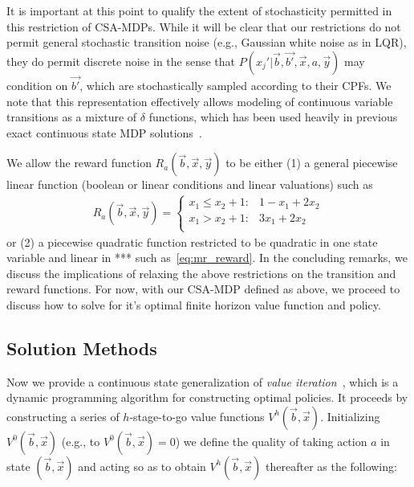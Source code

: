 It is important at this point to qualify the extent of stochasticity
permitted in this restriction of CSA-MDPs.  While it will be clear
that our restrictions do not permit general stochastic transition noise
(e.g., Gaussian white noise as in LQR), they do permit discrete noise
in the sense that $P(x_j'|\vec{b},\vec{b'},\vec{x},a,\vec{y})$
may condition on $\vec{b'}$, which are stochastically sampled according
to their CPFs.  
We note that this representation effectively allows modeling of
continuous variable transitions as a mixture of $\delta$ functions,
which has been used heavily in previous exact continuous state MDP 
solutions~\cite{feng04,hao09}.


We allow the reward function $R_a(\vec{b},\vec{x},\vec{y})$ to be either
(1) a general piecewise linear function (boolean or linear conditions
and linear valuations) such as
\begin{align}
R_a(\vec{b},\vec{x},\vec{y}) = \begin{cases}
x_1 \leq x_2 + 1 : & 1 - x_1 + 2x_2 \\
x_1 > x_2 + 1:     & 3x_1 + 2x_2 \\
\end{cases} \label{eq:linear_reward}
\end{align}
or (2) a piecewise quadratic function restricted to be quadratic in
one state variable and linear in *** such as~\eqref{eq:mr_reward}.  In
the concluding remarks, we discuss the implications of
relaxing the above restrictions on the transition and reward
functions.  For now, with our CSA-MDP defined as above, we proceed
to discuss how to solve for it's optimal finite horizon value
function and policy.

\subsection{Solution Methods}

\label{sec:soln}

Now we provide a continuous state generalization of {\it
value iteration}~\cite{bellman}, which is a dynamic programming
algorithm for constructing optimal policies.  It proceeds by
constructing a series of $h$-stage-to-go value functions
$V^h(\vec{b},\vec{x})$.  Initializing $V^0(\vec{b},\vec{x})$ 
(e.g., to $V^0(\vec{b},\vec{x}) = 0$) 
we define the quality of taking action $a$ in state
$(\vec{b},\vec{x})$ and acting so as to obtain $V^{h}(\vec{b},\vec{x})$ 
thereafter as the following:
\vspace{-3mm}

